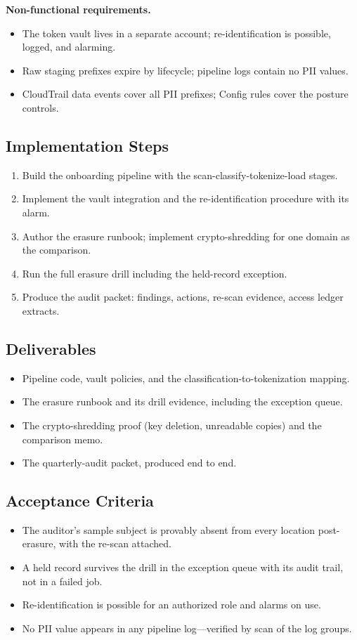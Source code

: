 \textbf{Non-functional requirements.}
\begin{itemize}
    \item The token vault lives in a separate account; re-identification is possible, logged, and alarming.
    \item Raw staging prefixes expire by lifecycle; pipeline logs contain no PII values.
    \item CloudTrail data events cover all PII prefixes; Config rules cover the posture controls.
\end{itemize}

\subsection*{Implementation Steps}
\begin{enumerate}
    \item Build the onboarding pipeline with the scan-classify-tokenize-load stages.
    \item Implement the vault integration and the re-identification procedure with its alarm.
    \item Author the erasure runbook; implement crypto-shredding for one domain as the comparison.
    \item Run the full erasure drill including the held-record exception.
    \item Produce the audit packet: findings, actions, re-scan evidence, access ledger extracts.
\end{enumerate}

\subsection*{Deliverables}
\begin{itemize}
    \item Pipeline code, vault policies, and the classification-to-tokenization mapping.
    \item The erasure runbook and its drill evidence, including the exception queue.
    \item The crypto-shredding proof (key deletion, unreadable copies) and the comparison memo.
    \item The quarterly-audit packet, produced end to end.
\end{itemize}

\subsection*{Acceptance Criteria}
\begin{itemize}
    \item The auditor's sample subject is provably absent from every location post-erasure, with the re-scan attached.
    \item A held record survives the drill in the exception queue with its audit trail, not in a failed job.
    \item Re-identification is possible for an authorized role and alarms on use.
    \item No PII value appears in any pipeline log---verified by scan of the log groups.
\end{itemize}

